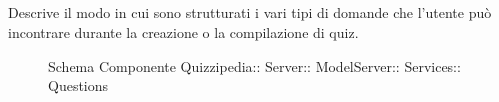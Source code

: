 \subsection{}
Descrive il modo in cui sono strutturati i vari tipi di domande che l'utente può incontrare durante la creazione o la compilazione di quiz.
\begin{figure}[H]
\centering
\noindent{}
\caption[Schema Componente Questions]{Schema Componente Quizzipedia:: Server:: ModelServer:: Services:: Questions}
\end{figure}
